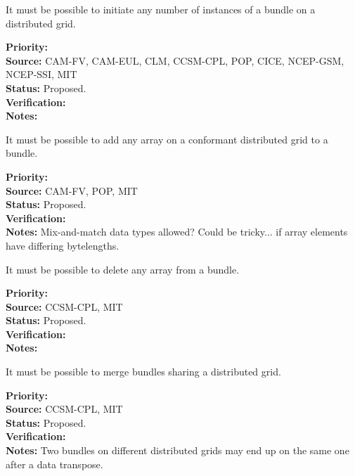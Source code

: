 
It must be possible to initiate any number of instances of a bundle on
a distributed grid.

\begin{reqlist}
{\bf Priority:} \\ 
{\bf Source:} CAM-FV, CAM-EUL, CLM, CCSM-CPL, POP, CICE, NCEP-GSM, NCEP-SSI, MIT \\
{\bf Status:} Proposed. \\
{\bf Verification:} \\
{\bf Notes:}
\end{reqlist}


It must be possible to add any array on a conformant distributed grid
to a bundle.

\begin{reqlist}
{\bf Priority:} \\ 
{\bf Source:} CAM-FV, POP, MIT \\
{\bf Status:} Proposed. \\
{\bf Verification:} \\
{\bf Notes:} Mix-and-match data types allowed? Could be tricky... if
  array elements have differing bytelengths.
\end{reqlist}


It must be possible to delete any array from a bundle.

\begin{reqlist}
{\bf Priority:} \\
{\bf Source:} CCSM-CPL, MIT \\
{\bf Status:} Proposed. \\
{\bf Verification:} \\
{\bf Notes:}
\end{reqlist}


It must be possible to merge bundles sharing a distributed grid.

\begin{reqlist}
{\bf Priority:} \\
{\bf Source:} CCSM-CPL, MIT \\
{\bf Status:} Proposed. \\
{\bf Verification:} \\
{\bf Notes:} Two bundles on different distributed grids may end up on the same
  one after a data transpose.
\end{reqlist}

